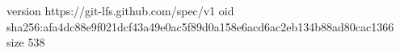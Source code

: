 version https://git-lfs.github.com/spec/v1
oid sha256:afa4dc88e9f021dcf43a49e0ac5f89d0a158e6acd6ac2eb134b88ad80cac1366
size 538
